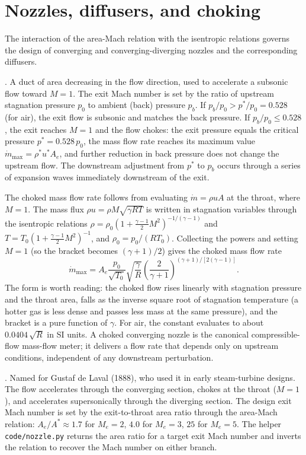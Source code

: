 \section{Nozzles, diffusers, and choking}

The interaction of the area-Mach relation with the isentropic
relations governs the design of converging and converging-diverging
nozzles and the corresponding diffusers.

. A duct of area decreasing in the flow
direction, used to accelerate a subsonic flow toward $M = 1$. The
exit Mach number is set by the ratio of upstream stagnation
pressure $p_0$ to ambient (back) pressure $p_b$. If $p_b/p_0 >
p^*/p_0 = 0.528$ (for air), the exit flow is subsonic and matches
the back pressure. If $p_b/p_0 \le 0.528$, the exit reaches $M = 1$
and the flow chokes: the exit pressure equals the critical pressure
$p^* = 0.528\,p_0$, the mass flow rate reaches its maximum value
$\dot{m}_{\max} = \rho^* u^* A_e$, and further reduction in back
pressure does not change the upstream flow. The downstream
adjustment from $p^*$ to $p_b$ occurs through a series of
expansion waves immediately downstream of the exit.

The choked mass flow rate follows from evaluating $\dot m = \rho u A$
at the throat, where $M = 1$. The mass flux $\rho u = \rho M
\sqrt{\gamma R T}$ is written in stagnation variables through the
isentropic relations $\rho = \rho_0 (1 + \frac{\gamma - 1}{2}M^2)^{-1/
(\gamma - 1)}$ and $T = T_0 (1 + \frac{\gamma - 1}{2}M^2)^{-1}$, and
$\rho_0 = p_0/(R T_0)$. Collecting the powers and setting $M = 1$ (so
the bracket becomes $(\gamma + 1)/2$) gives the choked mass flow rate
\[
\dot{m}_{\max} = A_e \frac{p_0}{\sqrt{T_0}}\sqrt{\frac{\gamma}{R}}
\left(\frac{2}{\gamma + 1}\right)^{(\gamma + 1)/[2(\gamma - 1)]}.
\]
The form is worth reading: the choked flow rises linearly with
stagnation pressure and the throat area, falls as the inverse square
root of stagnation temperature (a hotter gas is less dense and passes
less mass at the same pressure), and the bracket is a pure function of
$\gamma$. For air, the constant evaluates to about $0.0404\,\sqrt{R}$
in SI units. A choked converging nozzle is the canonical compressible-flow
mass-flow meter; it delivers a flow rate that depends only on
upstream conditions, independent of any downstream perturbation.

. Named for Gustaf
de Laval (1888), who used it in early steam-turbine designs. The
flow accelerates through the converging section, chokes at the
throat ($M = 1$), and accelerates supersonically through the
diverging section. The design exit Mach number is set by the
exit-to-throat area ratio through the area-Mach relation: $A_e/A^*
\approx 1.7$ for $M_e = 2$, $4.0$ for $M_e = 3$, $25$ for $M_e =
5$. The helper \texttt{code/nozzle.py} returns the area ratio for a
target exit Mach number and inverts the relation to recover the Mach
number on either branch.

